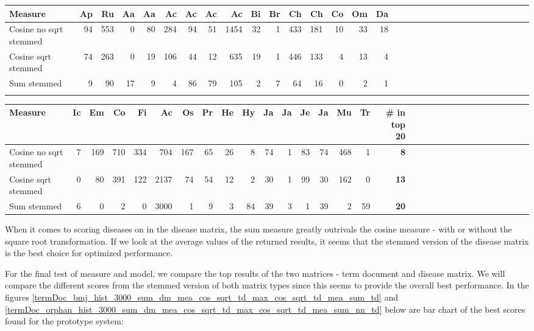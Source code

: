 \begin{table}[H]
  \begin{tiny}
    \begin{tabular}{|l|r|r|r|r|r|r|r|r|r|r|r|r|r|r|r|r|r|r|r|r|r|r|r|r|r|r|r|r|r|r|r|}
      \hline
      Measure &Ap&Ru&Aa&Aa&Ac&Ac&Ac&Ac&Bi&Br&Ch&Ch&Co&Om&Da\\
      \hline
      Cosine no sqrt stemmed &94&553&0&80&284&94&51&1454&32&1&433&181&10&33&18 \\
      \hline
      Cosine sqrt stemmed &74&263&0&19&106&44&12&635&19&1&446&133&4&13&4 \\
      \hline
      Sum stemmed &9&90&17&9&4&86&79&105&2&7&64&16&0&2&1\\
      \hline
      \multicolumn{16}{c}{} \\
    \end{tabular}
    \begin{tabular}{|l|r|r|r|r|r|r|r|r|r|r|r|r|r|r|r|r|r|r|r|r|r|r|r|r|r|r|r|r|r|r|}
      \hline
      Measure &Ic&Em&Co&Fi&Ac&Os&Pr&He&Hy&Ja&Ja&Je&Ja&Mu&Tr &  \scriptsize{\textbf{\# in top 20}} \\
      \hline
      Cosine no sqrt stemmed &7&169&710&334&704&167&65&26&8&74&1&83&74&468&1 & \scriptsize{\textbf{8}} \\
      \hline
      Cosine sqrt stemmed &0&80&391&122&2137&74&54&12&2&30&1&99&30&162&0 &\scriptsize{\textbf{13}} \\
      \hline
      Sum stemmed &6&0&2&0&3000&1&9&3&84&39&3&1&39&2&59 & \scriptsize{\textbf{20}} \\
      \hline
    \end{tabular}
  \end{tiny}
\end{table}

When it comes to scoring diseases on in the disease matrix, the sum measure greatly outrivals the 
cosine measure - with or without the square root transformation. If we look at the average values 
of the returned results, it seems that the stemmed version of the disease matrix is the best choice 
for optimized performance.

For the final test of measure and model, we compare the top results of the two matrices - term 
document and disease matrix. We will compare the different scores from the stemmed version of 
both matrix types since this seems to provide the overall best performance. In the figures 
\ref{termDoc_bmj_hist_3000_sum_dm_mea_cos_sqrt_td_max_cos_sqrt_td_mea_sum_td} and 
\ref{termDoc_orphan_hist_3000_sum_dm_mea_cos_sqrt_td_max_cos_sqrt_td_mea_sum_nn_td} below are 
bar chart of the best scores found for the prototype system:

